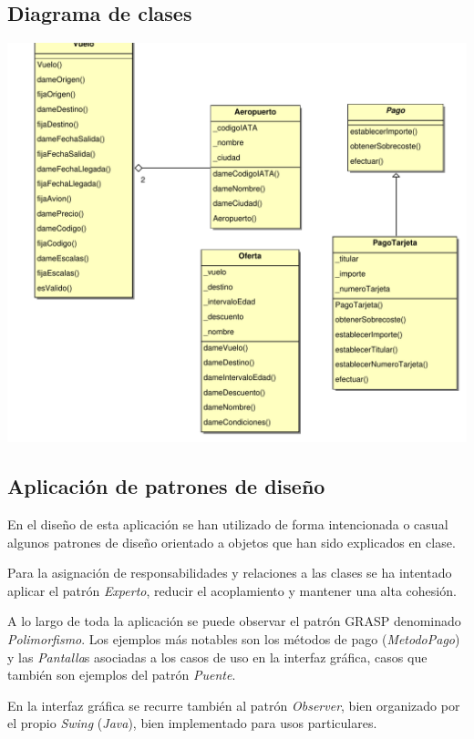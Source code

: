 \documentclass[11pt, a4paper, twoside, titlepage]{article}
\begin{document}
		\subsection{Diagrama de clases}
			\begin{center}
				\hspace{-2cm}
				\includegraphics[scale=.57]{diseno/diagramas/diagramaclases.pdf}
			\end{center}

		\subsection{Aplicación de patrones de diseño}
En el diseño de esta aplicación \software se han utilizado de forma intencionada o casual algunos patrones de diseño orientado a objetos que han sido explicados en clase.

		Para la asignación de responsabilidades y relaciones a las clases se ha intentado aplicar el patrón \textit{Experto}, reducir el acoplamiento y 	mantener una alta cohesión.

		A lo largo de toda la aplicación se puede observar el patrón GRASP denominado \textit{Polimorfismo}. Los ejemplos más notables son los métodos de pago (\textit{MetodoPago}) y las \textit{Pantalla}s asociadas a los casos de uso en la interfaz gráfica, casos que también son ejemplos del patrón \textit{Puente}.

		En la interfaz gráfica se recurre también al patrón \textit{Observer}, bien organizado por el propio \textit{Swing} (\textit{Java}), bien implementado para usos particulares.
\end{document}
